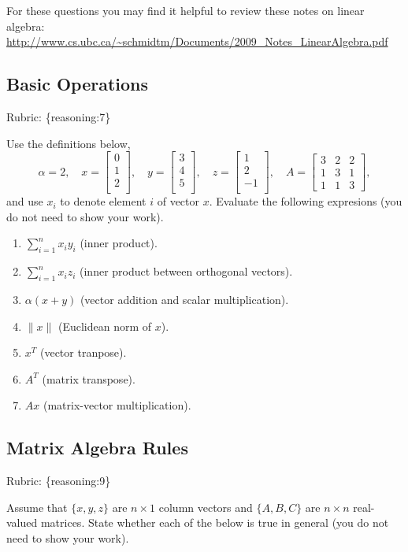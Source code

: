 \documentclass{article}
\def\rubric#1{\gre{Rubric: \{#1\}}}{}
\def\blu#1{{\color{blu}#1}}
\def\gre#1{{\color{gre}#1}}
\def\norm#1{\|#1\|}
\def\enum#1{\begin{enumerate}#1\end{enumerate}}
\begin{document}
For these questions you may find it helpful to review these notes on linear algebra:\\
\url{http://www.cs.ubc.ca/~schmidtm/Documents/2009_Notes_LinearAlgebra.pdf}

\subsection{Basic Operations}
\rubric{reasoning:7}

Use the definitions below,
\[
\alpha = 2,\quad
x = \left[\begin{array}{c}
0\\
1\\
2\\
\end{array}\right], \quad 
y = \left[\begin{array}{c}
3\\
4\\
5\\
\end{array}\right],\quad
z = \left[\begin{array}{c}
1\\
2\\
-1\\
\end{array}\right],\quad
A = \left[\begin{array}{ccc}
3 & 2 & 2\\
1 & 3 & 1\\
1 & 1 & 3
\end{array}\right],
\]
and use $x_i$ to denote element $i$ of vector $x$.
\blu{Evaluate the following expresions} (you do not need to show your work).
\enum{
\item $\sum_{i=1}^n x_iy_i$ (inner product).
\item $\sum_{i=1}^n x_iz_i$ (inner product between orthogonal vectors).
\item $\alpha(x+y)$ (vector addition and scalar multiplication).
\item $\norm{x}$ (Euclidean norm of $x$).
\item $x^T$ (vector tranpose).
\item $A^T$ (matrix transpose).
\item $Ax$ (matrix-vector multiplication).
}
\subsection{Matrix Algebra Rules}
\rubric{reasoning:9}

Assume that $\{x,y,z\}$ are $n \times 1$ column vectors and $\{A,B,C\}$ are $n \times n$ real-valued matrices. \blu{State whether each of the below is true in general} (you do not need to show your work).
\end{document}
